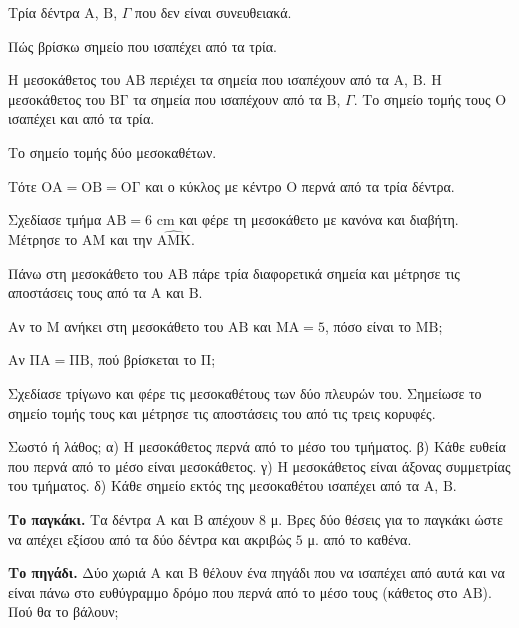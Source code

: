 \tixero Τρία δέντρα $\mathrm{Α}$, $\mathrm{Β}$, $\Gamma$ που δεν είναι συνευθειακά.\par
\tithelo Πώς βρίσκω σημείο που ισαπέχει από τα τρία.\par
\possindeo Η μεσοκάθετος του $\mathrm{ΑΒ}$ περιέχει τα σημεία που ισαπέχουν από τα $\mathrm{Α}$, $\mathrm{Β}$. Η μεσοκάθετος του $\mathrm{ΒΓ}$ τα σημεία που ισαπέχουν από τα $\mathrm{Β}$, $\Gamma$. Το σημείο τομής τους $\mathrm{Ο}$ ισαπέχει και από τα τρία.\par
\apantisi Το σημείο τομής δύο μεσοκαθέτων.\par
\elegxos Τότε $\mathrm{ΟΑ}=\mathrm{ΟΒ}=\mathrm{ΟΓ}$ και ο κύκλος με κέντρο $\mathrm{Ο}$ περνά από τα τρία δέντρα.



\ex Σχεδίασε τμήμα $\mathrm{ΑΒ}=6$ cm και φέρε τη μεσοκάθετο με κανόνα και διαβήτη. Μέτρησε το $\mathrm{ΑΜ}$ και την $\widehat{\mathrm{ΑΜΚ}}$.

\ex Πάνω στη μεσοκάθετο του $\mathrm{ΑΒ}$ πάρε τρία διαφορετικά σημεία και μέτρησε τις αποστάσεις τους από τα $\mathrm{Α}$ και $\mathrm{Β}$.

\ex Αν το $\mathrm{Μ}$ ανήκει στη μεσοκάθετο του $\mathrm{ΑΒ}$ και $\mathrm{ΜΑ}=5$, πόσο είναι το $\mathrm{ΜΒ}$;

\ex Αν $\mathrm{ΠΑ}=\mathrm{ΠΒ}$, πού βρίσκεται το $\mathrm{Π}$;

\ex Σχεδίασε τρίγωνο και φέρε τις μεσοκαθέτους των δύο πλευρών του. Σημείωσε το σημείο τομής τους και μέτρησε τις αποστάσεις του από τις τρεις κορυφές.

\ex Σωστό ή λάθος; α) Η μεσοκάθετος περνά από το μέσο του τμήματος. \quad β) Κάθε ευθεία που περνά από το μέσο είναι μεσοκάθετος. \quad γ) Η μεσοκάθετος είναι άξονας συμμετρίας του τμήματος. \quad δ) Κάθε σημείο εκτός της μεσοκαθέτου ισαπέχει από τα $\mathrm{Α}$, $\mathrm{Β}$.


\ex \textbf{Το παγκάκι.} Τα δέντρα $\mathrm{Α}$ και $\mathrm{Β}$ απέχουν $8$ μ. Βρες δύο θέσεις για το παγκάκι ώστε να απέχει εξίσου από τα δύο δέντρα και ακριβώς $5$ μ. από το καθένα.

\ex \textbf{Το πηγάδι.} Δύο χωριά $\mathrm{Α}$ και $\mathrm{Β}$ θέλουν ένα πηγάδι που να ισαπέχει από αυτά και να είναι πάνω στο ευθύγραμμο δρόμο που περνά από το μέσο τους (κάθετος στο $\mathrm{ΑΒ}$). Πού θα το βάλουν;

